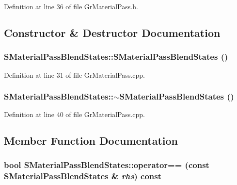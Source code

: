 Definition at line 36 of file GrMaterialPass.h.

\subsection{Constructor \& Destructor Documentation}
\hypertarget{struct_s_material_pass_blend_states_3b8e98df5242bf29099839b42bdb7456}{
\subsubsection[{SMaterialPassBlendStates}]{\setlength{\rightskip}{0pt plus 5cm}SMaterialPassBlendStates::SMaterialPassBlendStates ()}}
\label{struct_s_material_pass_blend_states_3b8e98df5242bf29099839b42bdb7456}




Definition at line 31 of file GrMaterialPass.cpp.\hypertarget{struct_s_material_pass_blend_states_01d143925b7b5e1e5dd9d57e6a2a7f2c}{
\subsubsection[{$\sim$SMaterialPassBlendStates}]{\setlength{\rightskip}{0pt plus 5cm}SMaterialPassBlendStates::$\sim$SMaterialPassBlendStates ()}}
\label{struct_s_material_pass_blend_states_01d143925b7b5e1e5dd9d57e6a2a7f2c}




Definition at line 40 of file GrMaterialPass.cpp.

\subsection{Member Function Documentation}
\hypertarget{struct_s_material_pass_blend_states_bf96120646a3703ba90c9848f7e4e266}{
\subsubsection[{operator==}]{\setlength{\rightskip}{0pt plus 5cm}bool SMaterialPassBlendStates::operator== (const {\bf SMaterialPassBlendStates} \& {\em rhs}) const}}
\label{struct_s_material_pass_blend_states_bf96120646a3703ba90c9848f7e4e266}




